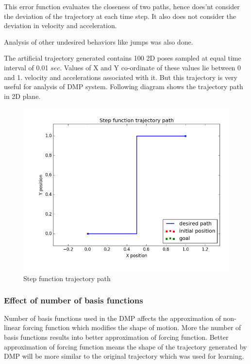 This error function evaluates the closeness of two paths, hence does'nt consider the deviation of the trajectory at each time step. It also does not consider the deviation in velocity and acceleration. 

 Analysis of other undesired behaviors like jumps was also done.  

The artificial trajectory generated contains 100 2D poses sampled at equal time interval of 0.01 $sec$. Values of X and Y co-ordinate of these values lie between 0 and 1. velocity and accelerations associated with it. But this trajectory is very useful for analysis of DMP system. Following diagram shows the trajectory path in 2D plane.  

\begin{figure}[H]
	\centering
	\includegraphics[scale=0.5]{images/step_function.png}
	\caption{Step function trajectory path}
	\label{fig:step_function}
\end{figure}

\subsubsection{Effect of number of basis functions}

Number of basis functions used in the DMP affects the approximation of non-linear forcing function which modifies the shape of motion. More the number of basis functions results into better approximation of forcing function. Better approximation of forcing function means the shape of the trajectory generated by DMP will be more similar to the original trajectory which was used for learning. 

